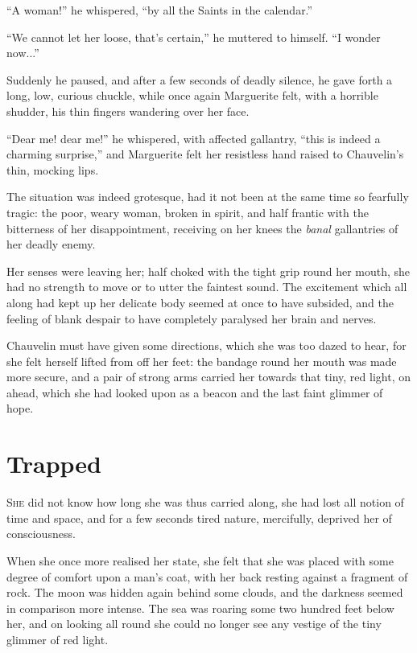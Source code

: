 \enquote{A woman!} he whispered, \enquote{by all the Saints in the calendar.}

\enquote{We cannot let her loose, that's certain,} he muttered to himself. \enquote{I wonder now...}

Suddenly he paused, and after a few seconds of deadly silence, he gave forth a long, low, curious chuckle, while once again Marguerite felt, with a horrible shudder, his thin fingers wandering over her face.

\enquote{Dear me! dear me!} he whispered, with affected gallantry, \enquote{this is indeed a charming surprise,} and Marguerite felt her resistless hand raised to Chauvelin's thin, mocking lips.

The situation was indeed grotesque, had it not been at the same time so fearfully tragic: the poor, weary woman, broken in spirit, and half frantic with the bitterness of her disappointment, receiving on her knees the \textit{banal} gallantries of her deadly enemy.

Her senses were leaving her; half choked with the tight grip round her mouth, she had no strength to move or to utter the faintest sound. The excitement which all along had kept up her delicate body seemed at once to have subsided, and the feeling of blank despair to have completely paralysed her brain and nerves.

Chauvelin must have given some directions, which she was too dazed to hear, for she felt herself lifted from off her feet: the bandage round her mouth was made more secure, and a pair of strong arms carried her towards that tiny, red light, on ahead, which she had looked upon as a beacon and the last faint glimmer of hope.

\chapter{Trapped}
\lettrine[lines=4]{S}{he} did not know how long she was thus carried along, she had lost all notion of time and space, and for a few seconds tired nature, mercifully, deprived her of consciousness.

When she once more realised her state, she felt that she was placed with some degree of comfort upon a man's coat, with her back resting against a fragment of rock. The moon was hidden again behind some clouds, and the darkness seemed in comparison more intense. The sea was roaring some two hundred feet below her, and on looking all round she could no longer see any vestige of the tiny glimmer of red light.

